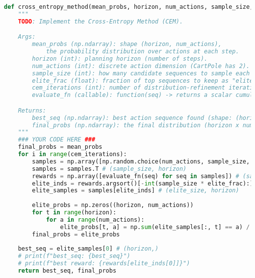\documentclass{article}
\begin{document}
\begin{solution}
\begin{lstlisting}[language=Python]
def cross_entropy_method(mean_probs, horizon, num_actions, sample_size, elite_frac, cem_iterations, evaluate_fn):
    """
    TODO: Implement the Cross-Entropy Method (CEM).

    Args:
        mean_probs (np.ndarray): shape (horizon, num_actions),
            the probability distribution over actions at each step.
        horizon (int): planning horizon (number of steps).
        num_actions (int): discrete action dimension (CartPole has 2).
        sample_size (int): how many candidate sequences to sample each iteration.
        elite_frac (float): fraction of top sequences to keep as "elite".
        cem_iterations (int): number of distribution-refinement iterations.
        evaluate_fn (callable): function(seq) -> returns a scalar cumulative reward for that action sequence.

    Returns:
        best_seq (np.ndarray): best action sequence found (shape: (horizon,))
        final_probs (np.ndarray): the final distribution (horizon x num_actions).
    """
    ### YOUR CODE HERE ###
    final_probs = mean_probs
    for i in range(cem_iterations):
        samples = np.array([np.random.choice(num_actions, sample_size, p=final_probs[t]) for t in range(horizon)]) # (horizon, sample_size)
        samples = samples.T # (sample_size, horizon)
        rewards = np.array([evaluate_fn(seq) for seq in samples]) # (sample_size,)
        elite_inds = rewards.argsort()[-int(sample_size * elite_frac):] # (elite_size,)
        elite_samples = samples[elite_inds] # (elite_size, horizon)
        
        elite_probs = np.zeros((horizon, num_actions))
        for t in range(horizon):
            for a in range(num_actions):
                elite_probs[t, a] = np.sum(elite_samples[:, t] == a) / elite_samples.shape[0]
        final_probs = elite_probs
        
    best_seq = elite_samples[0] # (horizon,)
    # print(f"best_seq: {best_seq}")
    # print(f"best reward: {rewards[elite_inds[0]]}")
    return best_seq, final_probs
\end{lstlisting}
\end{solution}
\end{document}
